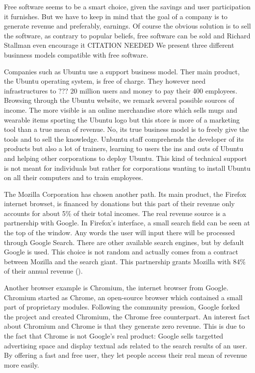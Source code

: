 \documentclass[12pt]{article}
\begin{document}
Free software seems to be a smart choice, given the savings and user
participation it furnishes. But we have to keep in mind that the goal
of a company is to generate revenue and preferably, earnings. Of
course the obvious solution is to sell the software, as contrary to
popular beliefs, free software can be sold and Richard Stallman even
encourage it CITATION NEEDED We present three different businness
models compatible with free software.

Companies such as Ubuntu use a support business model. Ther main
product, the Ubuntu operating system, is free of charge. They however
need infrastructures to ??? 20 million users and money to pay their
400 employees. Browsing through the Ubuntu website, we remark several
possible sources of income. The more visible is an online merchandise
store which sells mugs and wearable items sporting the Ubuntu logo but
this store is more of a marketing tool than a true mean of
revenue. No, its true business model is to freely give the tools and
to sell the knowledge. Unbuntu staff comprehends the developer of its
products but also a lot of trainers, learning to users the ins and
outs of Ubuntu and helping other corporations to deploy Ubuntu. This
kind of technical support is not meant for individuals but rather for
corporations wanting to install Ubuntu on all their computers and to
train employees.

The Mozilla Corporation has chosen another path. Its main product, the
Firefox internet browset, is financed by donations but this part of
their revenue only accounts for about 5\% of their total incomes. The
real revenue source is a partnership with Google. In Firefox's
interface, a small search field can be seen at the top of the
window. Any words the user will input there will be processed through
Google Search. There are other available search engines, but by
default Google is used. This choice is not random and actually comes
from a contract between Mozilla and the search giant. This partnership
grants Mozilla with 84\% of their annual revenue ().

Another browser example is Chromium, the internet browser from
Google. Chromium started as Chrome, an open-source browser which
contained a small part of proprietary modules. Following the community
pression, Google forked the project and created Chromium, the Chrome
free counterpart. An interest fact about Chromium and Chrome is that
they generate zero revenue. This is due to the fact that Chrome is not
Google's real product: Google sells targetted advertising space and
display textual ads related to the search results of an user. By
offering a fast and free user, they let people access their real mean
of revenue more easily.
\end{document}
